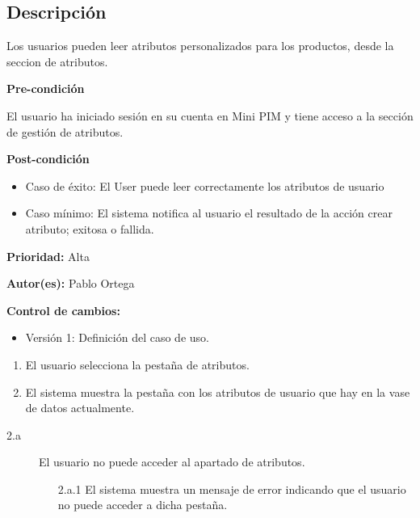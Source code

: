 

\subsection*{Descripción}
Los usuarios pueden leer atributos personalizados para los productos, desde la seccion de atributos.
\vspace{0.15cm}

\textbf{Pre-condición}\par
El usuario ha iniciado sesión en su cuenta en Mini PIM y tiene acceso a la sección de gestión de atributos.\par
\vspace{0.15cm}

\textbf{Post-condición}
\begin{itemize}
    \item Caso de éxito: El User puede leer correctamente los atributos de usuario
    \item Caso mínimo: El sistema notifica al usuario el resultado de la acción crear atributo; exitosa o fallida.
\end{itemize}

\textbf{Prioridad: }
Alta
\vspace{0.15cm}

\textbf{Autor(es): }
Pablo Ortega\par
\vspace{0.15cm}

\textbf{Control de cambios: }
\begin{itemize}
    \item Versión 1: Definición del caso de uso.
\end{itemize}

\begin{enumerate}
    \item El usuario selecciona la pestaña de atributos.
    \item El sistema muestra la pestaña con los atributos de usuario que hay en la vase de datos actualmente.
\end{enumerate}

\begin{description}
    \item[2.a] El usuario no puede acceder al apartado de atributos.
    \begin{enumerate}
        \item[2.a.1] El sistema muestra un mensaje de error indicando que el usuario no puede acceder a dicha pestaña.
    \end{enumerate}
\end{description}

